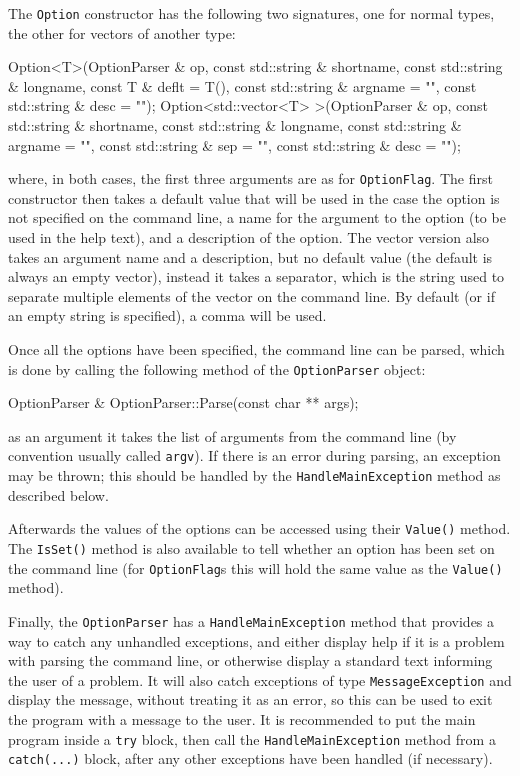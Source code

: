 The \texttt{Option} constructor has the following two signatures,
one for normal types, the other for vectors of another type:
\begin{listing}
Option<T>(OptionParser & op, const std::string & shortname,
          const std::string & longname, const T & deflt = T(),
          const std::string & argname = "", const std::string & desc = "");
Option<std::vector<T> >(OptionParser & op, const std::string & shortname,
          const std::string & longname, const std::string & argname = "",
          const std::string & sep = "", const std::string & desc = "");
\end{listing}
where, in both cases, the first three arguments are as for \texttt{OptionFlag}.
The first constructor then takes a default value that will be used
in the case the option is not specified on the command line,
a name for the argument to the option (to be used in the help text),
and a description of the option.
The vector version also takes an argument name and a description,
but no default value (the default is always an empty vector), instead it takes a separator,
which is the string used to separate multiple elements of the vector on the command line.
By default (or if an empty string is specified), a comma will be used.

Once all the options have been specified, the command line can be parsed,
which is done by calling the following method of the \texttt{OptionParser} object:
\begin{listing}
OptionParser & OptionParser::Parse(const char ** args);
\end{listing}
as an argument it takes the list of arguments from the command line (by convention usually called \texttt{argv}).
If there is an error during parsing, an exception may be thrown;
this should be handled by the \texttt{HandleMainException} method as described below.

Afterwards the values of the options can be accessed using their \texttt{Value()} method.
The \texttt{IsSet()} method is also available to tell whether an option has been set on the command line
(for \texttt{OptionFlag}s this will hold the same value as the \texttt{Value()} method).

Finally, the \texttt{OptionParser} has a \texttt{HandleMainException} method that provides
a way to catch any unhandled exceptions,
and either display help if it is a problem with parsing the command line,
or otherwise display a standard text informing the user of a problem.
It will also catch exceptions of type \texttt{MessageException} and display the message,
without treating it as an error, so this can be used to exit the program with a message to the user.
It is recommended to put the main program inside a \texttt{try} block,
then call the \texttt{HandleMainException} method from a \texttt{catch(...)} block,
after any other exceptions have been handled (if necessary).

